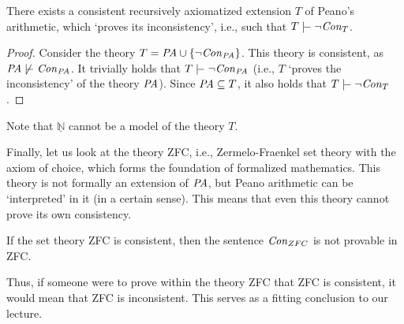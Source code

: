     \begin{corollary}
        There exists a consistent recursively axiomatized extension $T$ of Peano's arithmetic, which `proves its inconsistency', i.e., such that $T\proves \neg \Con_T$.
    \end{corollary}
    \begin{proof}
    Consider the theory $T=\text{\it PA} \cup \{\neg \mathit{Con}_{\text{\it PA}}\}$. This theory is consistent, as $\text{\it PA}\not\proves\Con_{\text{\it PA}}$. It trivially holds that $T\proves\neg\Con_{\text{\it PA}}$ (i.e., $T$ `proves the inconsistency' of the theory $\text{\it PA}$). Since $\text{\it PA}\subseteq T$, it also holds that $T\proves\neg\Con_T$.
    \end{proof}
    Note that $\underline{\mathbb{N}}$ cannot be a model of the theory $T$.
    
    Finally, let us look at the theory ZFC, i.e., Zermelo-Fraenkel set theory with the axiom of choice, which forms the foundation of formalized mathematics. This theory is not formally an extension of $\text{\it PA}$, but Peano arithmetic can be `interpreted' in it (in a certain sense). This means that even this theory cannot prove its own consistency.
    
    \begin{corollary}
        If the set theory ZFC is consistent, then the sentence $\mathit{Con}_{ZFC}$ is not provable in ZFC.
    \end{corollary}
    
    Thus, if someone were to prove within the theory ZFC that ZFC is consistent, it would mean that ZFC is inconsistent. This serves as a fitting conclusion to our lecture.
